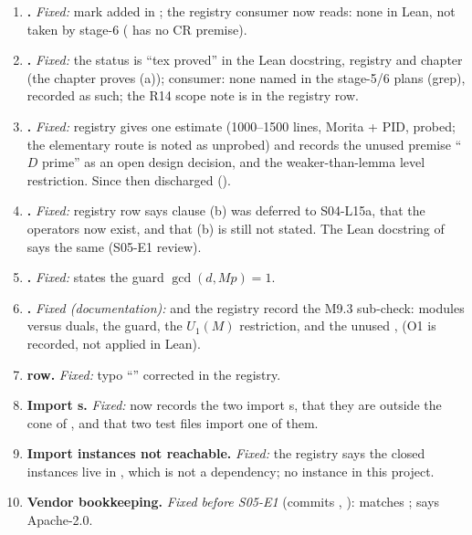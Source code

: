 \begin{enumerate}[leftmargin=1.6em,label=(I\arabic*),ref=I\arabic*]
\item\label{inc:cr} \textbf{.} \emph{Fixed:}  mark added in ; the
  registry consumer now reads: none in Lean, not taken by stage-6 ( has no CR premise).
\item\label{inc:mord} \textbf{.} \emph{Fixed:} the status is ``tex proved'' in the Lean docstring,
  registry and chapter (the chapter proves (a)); consumer: none named in the stage-5/6 plans (grep), recorded as such; the
  R14 scope note is in the registry row.
\item\label{inc:brandt} \textbf{.} \emph{Fixed:} registry gives one estimate (1000--1500 lines, Morita
  + PID, probed; the elementary route is noted as unprobed) and records the unused premise ``$D$ prime'' as an open design
  decision, and the weaker-than-lemma level restriction. Since then discharged ().
\item\label{inc:ihara} \textbf{.} \emph{Fixed:} registry row says clause (b) was deferred to S04-L15a, that the
  operators now exist, and that (b) is still not stated. The Lean docstring of  says the same (S05-E1 review).
\item\label{inc:guard} \textbf{.} \emph{Fixed:}  states the guard $\gcd(d,Mp)=1$.
\item \textbf{.} \emph{Fixed (documentation):}  and the registry record the
  M9.3 sub-check: modules versus duals, the guard, the $U_1(M)$ restriction, and the unused ,  (O1 is recorded,
  not applied in Lean).
\item \textbf{ row.} \emph{Fixed:} typo ``\lname{[D ≡ 2 mod 3\}}'' corrected in the registry.
\item \textbf{Import s.} \emph{Fixed:}  now records the two import s, that they are
  outside the cone of , and that two test files import one of them.
\item \textbf{Import instances not reachable.} \emph{Fixed:} the registry says the closed instances live in ,
  which is not a dependency; no instance in this project.
\item \textbf{Vendor bookkeeping.} \emph{Fixed before S05-E1} (commits , ): 
  matches ;  says Apache-2.0.

\end{enumerate}
